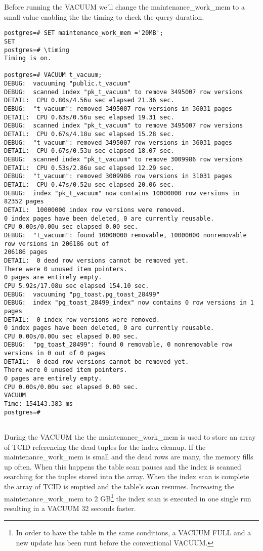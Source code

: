 Before running the VACUUM we'll change the maintenance\_work\_mem to a small value enabling the the 
timing to check the query duration.\newline

\begin{lstlisting}[style=pgsql]
postgres=# SET maintenance_work_mem ='20MB';
SET
postgres=# \timing
Timing is on.

postgres=# VACUUM t_vacuum;
DEBUG:  vacuuming "public.t_vacuum"
DEBUG:  scanned index "pk_t_vacuum" to remove 3495007 row versions
DETAIL:  CPU 0.80s/4.56u sec elapsed 21.36 sec.
DEBUG:  "t_vacuum": removed 3495007 row versions in 36031 pages
DETAIL:  CPU 0.63s/0.56u sec elapsed 19.31 sec.
DEBUG:  scanned index "pk_t_vacuum" to remove 3495007 row versions
DETAIL:  CPU 0.67s/4.18u sec elapsed 15.28 sec.
DEBUG:  "t_vacuum": removed 3495007 row versions in 36031 pages
DETAIL:  CPU 0.67s/0.53u sec elapsed 18.07 sec.
DEBUG:  scanned index "pk_t_vacuum" to remove 3009986 row versions
DETAIL:  CPU 0.53s/2.86u sec elapsed 12.29 sec.
DEBUG:  "t_vacuum": removed 3009986 row versions in 31031 pages
DETAIL:  CPU 0.47s/0.52u sec elapsed 20.06 sec.
DEBUG:  index "pk_t_vacuum" now contains 10000000 row versions in 82352 pages
DETAIL:  10000000 index row versions were removed.
0 index pages have been deleted, 0 are currently reusable.
CPU 0.00s/0.00u sec elapsed 0.00 sec.
DEBUG:  "t_vacuum": found 10000000 removable, 10000000 nonremovable row versions in 206186 out of 
206186 pages
DETAIL:  0 dead row versions cannot be removed yet.
There were 0 unused item pointers.
0 pages are entirely empty.
CPU 5.92s/17.08u sec elapsed 154.10 sec.
DEBUG:  vacuuming "pg_toast.pg_toast_28499"
DEBUG:  index "pg_toast_28499_index" now contains 0 row versions in 1 pages
DETAIL:  0 index row versions were removed.
0 index pages have been deleted, 0 are currently reusable.
CPU 0.00s/0.00u sec elapsed 0.00 sec.
DEBUG:  "pg_toast_28499": found 0 removable, 0 nonremovable row versions in 0 out of 0 pages
DETAIL:  0 dead row versions cannot be removed yet.
There were 0 unused item pointers.
0 pages are entirely empty.
CPU 0.00s/0.00u sec elapsed 0.00 sec.
VACUUM
Time: 154143.383 ms
postgres=# 


\end{lstlisting}

During the VACUUM the the maintenance\_work\_mem is used to store an array of TCID referencing 
the dead tuples for the index cleanup. If the maintenance\_work\_mem is small and the dead rows are 
many, the memory fills up often. When this happens the table scan pauses and the index is 
scanned searching for the tuples stored into the array. When the index scan is complete the array of 
TCID is emptied and the table's scan resumes. Increasing the maintenance\_work\_mem to 2 
GB\footnote{In order to have the table in the same conditions, a VACUUM FULL and a new update has 
been runt before the conventional VACUUM.} the index scan is executed in one single run 
resulting in a VACUUM 32 seconds faster.\newline

